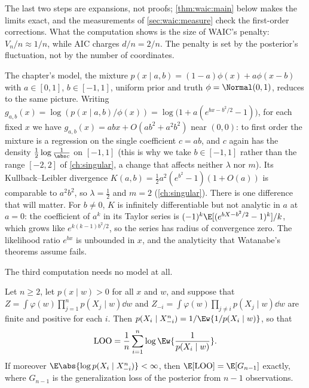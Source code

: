 \begin{refsection}
The last two steps are expansions, not proofs; \cref{thm:waic:main} below makes the limits exact, and the measurements of \cref{sec:waic:measure} check the first-order corrections. What the computation shows is the size of WAIC's penalty: $V_n/n\approx1/n$, while AIC charges $d/n=2/n$. The penalty is set by the posterior's fluctuation, not by the number of coordinates.

The chapter's model, the mixture $p(x\mid a,b)=(1-a)\phi(x)+a\phi(x-b)$ with $a\in[0,1]$, $b\in[-1,1]$, uniform prior and truth $\phi=\Normal(0,1)$, reduces to the same picture. Writing $g_{a,b}(x)=\log(p(x\mid a,b)/\phi(x))=\log\bigl(1+a(e^{bx-b^2/2}-1)\bigr)$, for each fixed $x$ we have $g_{a,b}(x)=abx+O(ab^2+a^2b^2)$ near $(0,0)$: to first order the mixture is a regression on the single coefficient $c=ab$, and $c$ again has the density $\tfrac12\log\frac1{\abs c}$ on $[-1,1]$ (this is why we take $b\in[-1,1]$ rather than the range $[-2,2]$ of \cref{ch:singular}, a change that affects neither $\lambda$ nor $m$). Its Kullback--Leibler divergence $K(a,b)=\tfrac12a^2(e^{b^2}-1)(1+O(a))$ is comparable to $a^2b^2$, so $\lambda=\tfrac12$ and $m=2$ (\cref{ch:singular}). There is one difference that will matter. For $b\ne0$, $K$ is infinitely differentiable but not analytic in $a$ at $a=0$: the coefficient of $a^k$ in its Taylor series is $(-1)^k\E[(e^{bX-b^2/2}-1)^k]/k$, which grows like $e^{k(k-1)b^2/2}$, so the series has radius of convergence zero. The likelihood ratio $e^{bx}$ is unbounded in $x$, and the analyticity that Watanabe's theorems assume fails.

The third computation needs no model at all.

\begin{lemma}\label{lem:waic:importance}
Let $n\ge2$, let $p(x\mid w)>0$ for all $x$ and $w$, and suppose that $Z=\int\varphi(w)\prod_{j=1}^np(X_j\mid w)\dd w$ and $Z_{-i}=\int\varphi(w)\prod_{j\ne i}p(X_j\mid w)\dd w$ are finite and positive for each $i$. Then $p(X_i\mid X^n_{-i})=1/\Ew{1/p(X_i\mid w)}$, so that
\[
\waicLOO=\frac1n\sum_{i=1}^n\log\Ew{\frac1{p(X_i\mid w)}}.
\]
If moreover $\E\abs{\log p(X_i\mid X^n_{-i})}<\infty$, then $\E[\waicLOO]=\E[G_{n-1}]$ exactly, where $G_{n-1}$ is the generalization loss of the posterior from $n-1$ observations.
\end{lemma}


\end{refsection}
